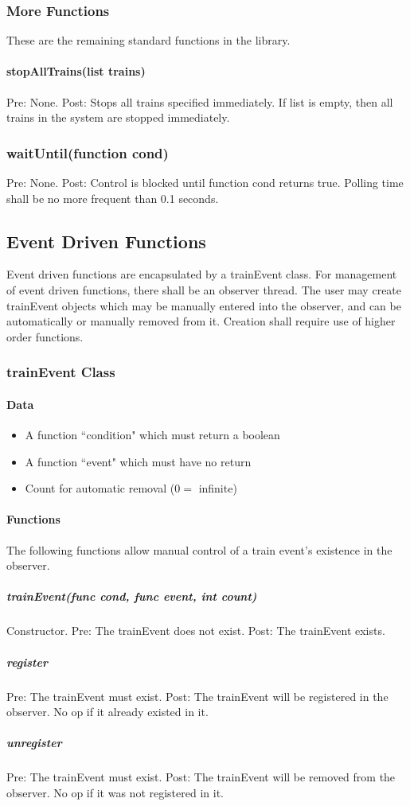 \documentclass[a4paper,11pt,notitlepage]{article}
\begin{document}
\subsubsection{More Functions}
These are the remaining standard functions in the library.
\paragraph{stopAllTrains(list trains)} Pre: None. Post: Stops all trains specified immediately. If list is empty, then all trains in the system are stopped immediately.
\subsubsection{waitUntil(function cond)} Pre: None. Post: Control is blocked until function cond returns true. Polling time shall be no more frequent than 0.1 seconds.

\subsection{Event Driven Functions}
Event driven functions are encapsulated by a trainEvent class. For management of event driven functions, there shall be an observer thread. The user may create trainEvent objects which may be manually entered into the observer, and can be automatically or manually removed from it. Creation shall require use of higher order functions.
\subsubsection{trainEvent Class}
\paragraph{Data}
\begin{itemize}
\item A function ``condition" which must return a boolean
\item A function ``event" which must have no return
\item Count for automatic removal ($0 =$ infinite)
\end{itemize}
\paragraph{Functions}
The following functions allow manual control of a train event's existence in the observer.
\subparagraph{trainEvent(func cond, func event, int count)} Constructor. Pre: The trainEvent does not exist. Post: The trainEvent exists.
\subparagraph{register} Pre: The trainEvent must exist. Post: The trainEvent will be registered in the observer. No op if it already existed in it.
\subparagraph{unregister} Pre: The trainEvent must exist. Post: The trainEvent will be removed from the observer. No op if it was not registered in it.
\end{document}
